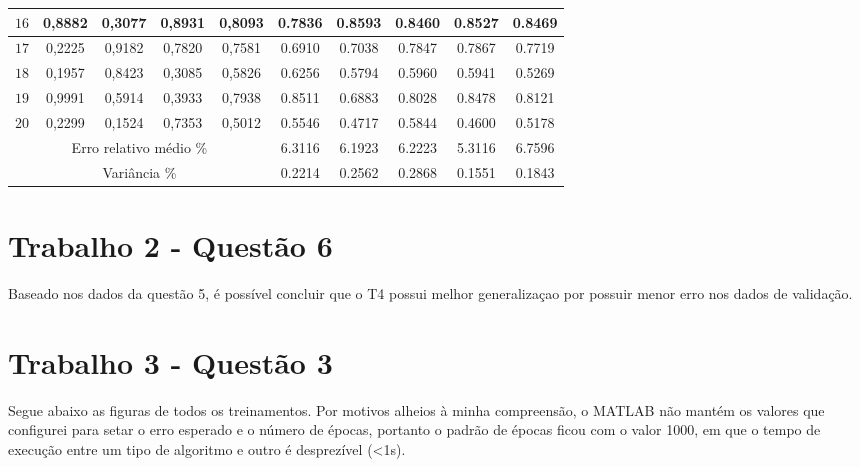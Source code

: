 \documentclass[a4paper]{article}
\begin{document}
\begin{tabular}{|c|c|c|c|c|c|c|c|c|c|}
$16$ & 0,8882 & 0,3077 & 0,8931 & 0,8093 & 0.7836 & 0.8593 & 0.8460 & 0.8527 & 0.8469 \\ \hline
$17$ & 0,2225 & 0,9182 & 0,7820 & 0,7581 & 0.6910 & 0.7038 & 0.7847 & 0.7867 & 0.7719 \\ \hline
$18$ & 0,1957 & 0,8423 & 0,3085 & 0,5826 & 0.6256 & 0.5794 & 0.5960 & 0.5941 & 0.5269 \\ \hline
$19$ & 0,9991 & 0,5914 & 0,3933 & 0,7938 & 0.8511 & 0.6883 & 0.8028 & 0.8478 & 0.8121 \\ \hline
$20$ & 0,2299 & 0,1524 & 0,7353 & 0,5012 & 0.5546 & 0.4717 & 0.5844 & 0.4600 & 0.5178 \\ \hline
\multicolumn{5}{|c|}{Erro relativo m\'edio \%}& 6.3116 & 6.1923 & 6.2223 & 5.3116 & 6.7596 \\ \hline
\multicolumn{5}{|c|}{Vari\^ancia \%}& 0.2214 & 0.2562 & 0.2868 & 0.1551 & 0.1843 \\ \hline
\end{tabular}

\section*{Trabalho 2 - Quest\~ao 6}

Baseado nos dados da quest\~ao 5, \'e poss\'ivel concluir que o T4 possui melhor generaliza\c{c}ao por possuir menor erro nos dados de valida\c{c}\~ao.


\section*{Trabalho 3 - Quest\~ao 3}

Segue abaixo as figuras de todos os treinamentos. Por motivos alheios à minha compreensão, o MATLAB não mantém os valores que configurei para setar o erro esperado e o número de épocas, portanto o padrão de épocas ficou com o valor 1000, em que o tempo de execução entre um tipo de algoritmo e outro é desprezível (\textless 1s).
\end{document}
